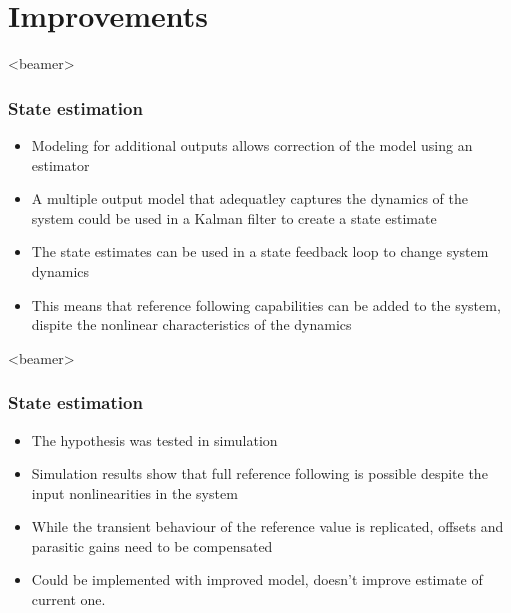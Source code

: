 \section{Improvements}
\begin{frame}<beamer>
\frametitle{State estimation}
  \begin{itemize}
    \item<1-> Modeling for additional outputs allows correction of the model using an estimator
    \item<2->  A multiple output model that adequatley captures the dynamics of the system could be used in a Kalman filter to create a state estimate
    \item<3-> The state estimates can be used in a state feedback loop to change system dynamics
    \item<4-> This means that reference following capabilities can be added to the system, dispite the nonlinear characteristics of the dynamics
  \end{itemize}
\end{frame}

\begin{frame}<beamer>
\frametitle{State estimation}
  \begin{itemize}
    \item<1-> The hypothesis was tested in simulation
    \item<2-> Simulation results show that full reference following is possible despite the input nonlinearities in the system
    \item<3-> While the transient behaviour of the reference value is replicated, offsets and parasitic gains need to be compensated
    \item<4-> Could be implemented with improved model, doesn't improve estimate of current one.
    \end{itemize}
\end{frame}